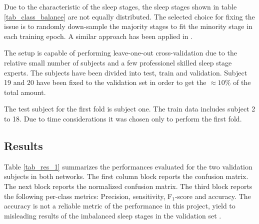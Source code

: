 Due to the characteristic of the sleep stages, the sleep stages shown in table \ref{tab_class_balance} are not equally distributed. The selected choice for fixing the issue is to randomly down-sample the majority stages to fit the minority stage in each training epoch. A similar approach has been applied in \cite{main_ar}. 

The setup is capable of performing leave-one-out cross-validation due to the relative small number of subjects and a few professionel skilled sleep stage experts.
The subjects have been divided into test, train and validation. Subject 19 and 20 have been fixed to the validation set in order to get the $\approx10\%$ of the total amount. 

The test subject for the first fold is subject one. The train data includes subject 2 to 18. Due to time considerations it was chosen only to perform the first fold.

\subsection{Results}
\label{subsec:results}

Table \ref{tab_res_1} summarizes the performances evaluated for the two validation subjects in both networks. 
The first column block reports the confusion matrix. The next block reports the normalized confusion matrix. The third block reports the following per-class metrics: Precision, sensitivity, F$_1$-score and accuracy. The accuracy is not a reliable metric of the performance in this project, yield to misleading results of the imbalanced sleep stages in the validation set \cite[sec. 11]{dl_book}.

